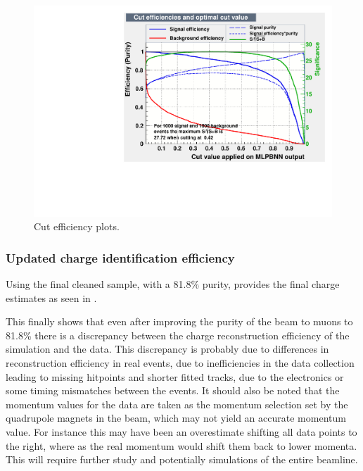 \begin{figure}[h!]
\centering

\includegraphics[width=\textwidth]{figures/TMVA/Cuts.pdf}
\caption{Cut efficiency plots.}
\label{fig:TMVAcuts}
\end{figure}




\clearpage
\subsubsection{Updated charge identification efficiency}

Using the final cleaned sample, with a 81.8\% purity, provides the final charge estimates as seen in .

This finally shows that even after improving the purity of the beam to muons to 81.8\% there is a discrepancy between the charge reconstruction efficiency of the simulation and the data. This discrepancy is probably due to differences in reconstruction efficiency in real events, due to inefficiencies in the data collection leading to missing hitpoints and shorter fitted tracks, due to the electronics or some timing mismatches between the events. It should also be noted that the momentum values for the data are taken as the momentum selection set by the quadrupole magnets in the beam, which may not yield an accurate momentum value. For instance this may have been an overestimate shifting all data points to the right, where as the real momentum would shift them back to lower momenta. This will require further study and potentially simulations of the entire beamline.


